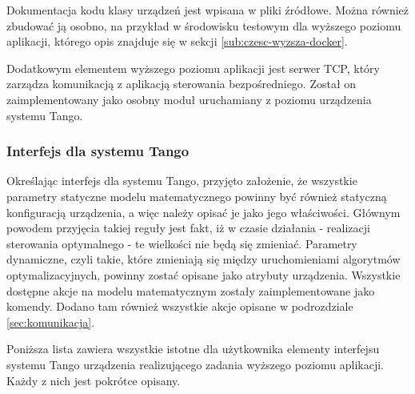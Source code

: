 Dokumentacja kodu klasy urządzeń jest wpisana w pliki źródłowe. Można również zbudować ją osobno, na przykład w środowisku testowym dla wyższego poziomu aplikacji, którego opis znajduje się w sekcji \ref{sub:czesc-wyzsza-docker}.

Dodatkowym elementem wyższego poziomu aplikacji jest serwer TCP, który zarządza komunikacją z aplikacją sterowania bezpośredniego. Został on zaimplementowany jako osobny moduł uruchamiany z poziomu urządzenia systemu Tango.

\subsubsection{Interfejs dla systemu Tango}

Określając interfejs dla systemu Tango, przyjęto założenie, że wszystkie parametry statyczne modelu matematycznego powinny być również statyczną konfiguracją urządzenia, a więc należy opisać je jako jego właściwości. Głównym powodem przyjęcia takiej reguły jest fakt, iż w czasie działania - realizacji sterowania optymalnego - te wielkości nie będą się zmieniać.
Parametry dynamiczne, czyli takie, które zmieniają się między uruchomieniami algorytmów optymalizacyjnych, powinny zostać opisane jako atrybuty urządzenia.
Wszystkie dostępne akcje na modelu matematycznym zostały zaimplementowane jako komendy. Dodano tam również wszystkie akcje opisane w podrozdziale \ref{sec:komunikacja}.

Poniższa lista zawiera wszystkie istotne dla użytkownika elementy interfejsu systemu Tango urządzenia realizującego zadania wyższego poziomu aplikacji. Każdy z nich jest pokrótce opisany.

